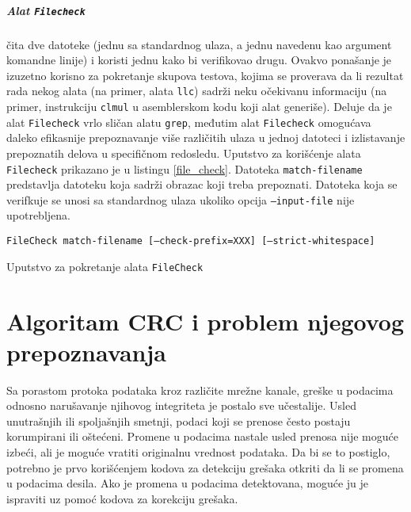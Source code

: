 \documentclass[12pt,oneside]{memoir}
\begin{document}
\paragraph{Alat \texttt{Filecheck}} čita dve datoteke (jednu sa standardnog ulaza, a jednu navedenu kao argument komandne linije) i koristi jednu kako bi verifikovao drugu. Ovakvo ponašanje je izuzetno korisno za pokretanje skupova testova, kojima se proverava da li rezultat rada nekog alata (na primer, alata \texttt{llc}) sadrži neku očekivanu informaciju (na primer, instrukciju \texttt{clmul} u asemblerskom kodu koji alat generiše). Deluje da je alat \texttt{Filecheck} vrlo sličan alatu \texttt{grep}, međutim alat \texttt{Filecheck} omogućava daleko efikasnije prepoznavanje više različitih ulaza u jednoj datoteci i izlistavanje prepoznatih delova u specifičnom redosledu. Uputstvo za korišćenje alata \texttt{Filecheck} prikazano je u listingu \ref{file_check}. Datoteka \texttt{match-filename} predstavlja datoteku koja sadrži obrazac koji treba prepoznati. Datoteka koja se verifkuje se unosi sa standardnog ulaza ukoliko opcija \texttt{--input-file} nije upotrebljena.



\begin{listing}[!ht]
\begin{verbatim}
FileCheck match-filename [–check-prefix=XXX] [–strict-whitespace]
\end{verbatim}
\caption{Uputstvo za pokretanje alata \texttt{FileCheck}}
\label{file_check}
\end{listing}




\chapter{Algoritam CRC i problem njegovog prepoznavanja}
\label{chap:crc}

Sa porastom protoka podataka kroz različite mrežne kanale, greške u podacima odnosno narušavanje 
njihovog integriteta je postalo sve učestalije. Usled unutrašnjih ili spoljašnjih 
smetnji, podaci koji se prenose često postaju korumpirani ili oštećeni. 
Promene u podacima nastale usled prenosa nije moguće izbeći, ali je moguće vratiti originalnu 
vrednost podataka. Da bi se to postiglo, potrebno je prvo korišćenjem kodova za detekciju grešaka 
otkriti da li se promena u podacima desila. Ako je promena u podacima detektovana, moguće ju je 
ispraviti uz pomoć kodova za korekciju grešaka. 
\end{document}
